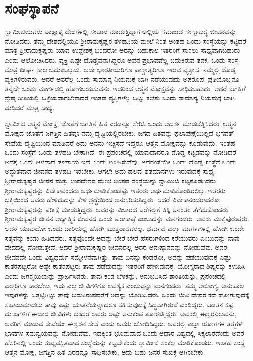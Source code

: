 
\chapter{ಸಂಘಸ್ಥಾಪನೆ}

 ಸ್ವಾಮೀಜಿಯವರು ಪಾಶ್ಚಾತ್ಯ ದೇಶಗಳಲ್ಲಿ ಸಂಚಾರ ಮಾಡುತ್ತಿದ್ದಾಗ ಅಲ್ಲಿಯ ಸಮಾಜದ ಸಂಸ್ಥಾಬದ್ಧ ಜೀವನವನ್ನು ನೋಡಿದರು. ತಮ್ಮ ದೇಶದಲ್ಲಿಯೂ ಶ‍್ರೀರಾಮಕೃಷ್ಣರ ತಳಹದಿಯ ಮೇಲೆ ನಿಂತ ಅಂತಹ ಒಂದು ಸಂಸ್ಥೆಯನ್ನು ಕಟ್ಟಿದರೆ ಮಾತ್ರ ಶ‍್ರೀರಾಮಕೃಷ್ಣರು ಯಾವ ಉದ್ದೇಶಕ್ಕೆ ಬಂದರೋ ಅದನ್ನು ಬಹುಕಾಲ ಇತರರಿಗೆ ಸಾರಲು ಸಾಧ್ಯವಾಗಬಹುದು ಎಂದು ಆಲೋಚಿಸಿದರು. ವ್ಯಕ್ತಿ ಎಷ್ಟೇ ದೊಡ್ಡವನಾಗಿದ್ದರೂ ಅವನ ಪ್ರಭಾವವೆಲ್ಲ ಬದುಕಿರುವ ತನಕ. ಒಂದು ಸಂಸ್ಥೆ ಮಾತ್ರ ದೀರ್ಘ ಕಾಲ ಬದುಕಬಲ್ಲದು. ಅದೇ ಭಾರತೀಯರಿಗೂ‌ ಪಾಶ್ಚಾತ್ಯರಿಗೂ ಇರುವ ವ್ಯತ್ಯಾಸ. ನಮ್ಮಲ್ಲಿ ದೊಡ್ಡ ವ್ಯಕ್ತಿಗಳಿರುವರು, ಆದರೆ ಅವರೆಲ್ಲ ಒಂದು ಸಾಮಾನ್ಯ ನಿಯಮಕ್ಕೆ ಬಾಗಿ ನಡೆಯುವುದು ಅಪರೂಪ. ಪ್ರತಿಯೊಬ್ಬನೂ ತನ್ನದೇ ಒಂದು ಮಾರ್ಗದಲ್ಲಿ ಹೋಗಬಯಸುವನು. ಇದರಿಂದ ಆತ್ಮನ ಮೋಕ್ಷವನ್ನು ಸಾಧಿಸಬಹುದು. ಆದರೆ ಜಗತ್ತಿಗೆ ಶ್ರೇಷ್ಠ ರೀತಿಯಲ್ಲಿ ಒಳ್ಳೆಯದಾಗಬೇಕಾದರೆ ಇಂತಹ ವ್ಯಕ್ತಿಗಳೆಲ್ಲ ಒಟ್ಟು ಕಲೆತು ಒಂದು ಸಾಮಾನ್ಯ ನಿಯಮಕ್ಕೆ ಬಾಗಿ ದುಡಿದರೆ ಮಾತ್ರ ಸಾಧ್ಯ. 

 ಸ್ವಾಮೀಜಿ ಆತ್ಮನ ಮೋಕ್ಷ, ಜೊತೆಗೆ ಜಗತ್ತಿನ ಹಿತ ಎರಡನ್ನೂ ಸೇರಿಸಿ ಒಂದು ಆದರ್ಶ ಮಾಡಲೆತ್ನಿಸಿದರು. ಆತ್ಮನ ಮೋಕ್ಷದ ಜೊತೆಗೆ ಜಗತ್ತಿನ ಹಿತವೂ ನಮ್ಮ ದೃಷ್ಟಿಯಲ್ಲಿರಬೇಕು. ಜಗದ ಹಿತವನ್ನು ಫಲಾಪೇಕ್ಷೆಯಿಲ್ಲದೆ ಭಗವತ್ ಸೇವೆಯ ದೃಷ್ಟಿಯಿಂದ ಮಾಡಿದರೆ ಅದು ಅವನು ಇಚ್ಛಿಸದೆ ಇದ್ದರೂ ಆತ್ಮನ ಮೋಕ್ಷವನ್ನು ಕೊಡುವುದು. ಇಂತಹ ಒಂದು ಸಂಸ್ಥೆಗೆ ಒಂದು ತಳಹದಿ ಬೇಕಾಗಿದೆ. ಈ ಪ್ರಪಂಚದಲ್ಲಿ ಯಾವುದಾದರೂ ದೊಡ್ಡ ಕಟ್ಟಡವನ್ನು ನೋಡಿದರೆ ಅದಕ್ಕೆ ಒಂದು ಆಳವಾದ ತಳಪಾಯ ಇದೆ ಎಂದು ಊಹಿಸುವೆವು. ಅದರಂತೆಯೇ ಒಂದು ದೊಡ್ಡ ಸಂಸ್ಥೆಗೆ ಒಂದು ಅದ್ಭುತವಾದ ಜೀವನದ ತಳಹದಿ ಇರಬೇಕು. ಆಗಲೇ ಅದು ಹಲವು ಶತಮಾನಗಳು ಇರುವುದಕ್ಕೆ ಸಾಧ್ಯ. ಶ‍್ರೀರಾಮಕೃಷ್ಣರ ಜೀವನ ಮತ್ತು ಉಪದೇಶದ ಮೇಲೆ ಅಂತಹ ಸಂಸ್ಥೆಯನ್ನು ಸ್ವಾಮೀಜಿ ಕಟ್ಟತೊಡಗಿದರು. ಶ‍್ರೀರಾಮಕೃಷ್ಣರನ್ನು ವಿವೇಕಾನಂದರು ಅರ್ಥಮಾಡಿಕೊಂಡಷ್ಟು ಇತರರು ಅರ್ಥಮಾಡಿಕೊಂಡಿರಲಿಲ್ಲ. ಇತರರು ಭಕ್ತಿಯಿಂದ ಅವರು ಹೇಳಿದುದನ್ನು ಕೇಳಿ ಶ್ರದ್ಧೆಯಿಂದ ಅನುಸರಿಸುತ್ತಿದ್ದರು. ಆದರೆ ವಿವೇಕಾನಂದರಾದರೋ ಶ‍್ರೀರಾಮಕೃಷ್ಣರನ್ನು ಪರೀಕ್ಷೆ ಮಾಡುತ್ತಿದ್ದರು. ಅವರನ್ನು ವಿಚಾರದ ಒರೆಗಲ್ಲಿಗೆ ತಿಕ್ಕಿ ಅನಂತರ ತೆಗೆದುಕೊಂಡರು. ಶ‍್ರೀರಾಮಕೃಷ್ಣರ ಜೀವನ ಆಧ್ಯಾತ್ಮಿಕ ಜೀವನದ ಒಂದು ಪರಾಕಾಷ್ಠೆ ಎಂಬುದನ್ನು ಮನಗಂಡರು. ಅವರು ಮುಕ್ತಪುರುಷರು. ಆದರೆ ಯಾವುದೋ ಒಂದು ದಾರಿಯಲ್ಲಿ ಹೋಗಿ ಮುಕ್ತರಾದವರಲ್ಲ. ಧರ್ಮದ ಎಲ್ಲಾ ಮಾರ್ಗಗಳಲ್ಲಿ ಹೋಗಿ ಒಂದೇ ಸತ್ಯವನ್ನು ಕಂಡು ಹಿಡಿದವರು. ಸತ್ಯವೊಂದೇ ಅದನ್ನು ಬೇರೆ ಬೇರೆ ಹೆಸರುಗಳಿಂದ ಕರೆಯುವರು ಎಂಬುದನ್ನು ನಾವು ವೇದದಲ್ಲಿ ನೋಡುತ್ತೇವೆ. ಆದರೆ ಶ‍್ರೀರಾಮಕೃಷ್ಣರ ಜೀವನದಲ್ಲಿ ಅದರ ಅನುಷ್ಠಾನವನ್ನು ನೋಡುವೆವು. ಅವರ ಜೀವನವೇ ಒಂದು ವಿಶ್ವಧರ್ಮ ಸಮ್ಮೇಳನವಾಗಿತ್ತು. ತಾವು ಏನನ್ನು ಕಂಡರೋ, ಅದನ್ನು ಪಡೆಯುವುದಕ್ಕೆ ಎಷ್ಟು ಕಾತರಪಟ್ಟರೋ ಅಷ್ಟೇ ಕಾತರಪಟ್ಟರು ತಾವು ಪಡೆದುದನ್ನು ಇತರರಿಗೆ ಹೇಳುವುದಕ್ಕೆ. ಯೋಗ್ಯರಾದ ಶಿಷ್ಯರನ್ನು ಕಳುಹಿಸಿ ಎಂದು ಜಗನ್ಮಯಿಯನ್ನು ಪ್ರಾರ್ಥಿಸಿದರು. ತಾವು ಕಂಡ ಬೆಳಕನ್ನು, ಅನುಭವಿಸಿದ ಶಾಂತಿಯನ್ನು, ಪ್ರಪಂಚದಲ್ಲಿ ಎಲ್ಲರಿಗೂ ಸಾರಬೇಕು, ಇದು ಎಲ್ಲ ಜೀವಿಗಳಿಗೂ ಆವಶ್ಯಕ ಎಂಬುದನ್ನು ಮನಗಂಡರು. ತಮ್ಮ ಆರೋಗ್ಯ, ಅನುಕೂಲ ಇವುಗಳನ್ನು ಒತ್ತಟ್ಟಿಗಿಟ್ಟು ತಾವು ಬದುಕಿರುವವರೆಗೆ ಅದನ್ನು ಬೋಧಿಸಿದರು. ಒಂದು ಜೀವಿ ದೇವರ ಕಡೆ ಹೋಗುವುದಕ್ಕೆ ಸಹಾಯಮಾಡಲು ತಾವು ಎಷ್ಟು ಯಾತನೆಯನ್ನಾದರೂ ಸಹಿಸುವುದಕ್ಕೆ ಸಿದ್ಧವಾಗಿರುವೆ ಎಂದಿದ್ದರು. ಬಡತನ ಕಷ್ಟ ದುಃಖಗಳಿಗೆ ಈಡಾದ ಜೀವಿಗಳು ಬಂದರೆ ಅವರು ಅಷ್ಟೇ ಅನುಕಂಪ ತೋರುತ್ತಿದ್ದರು. ಅವರಲ್ಲಿ ಈಶ್ವರನಿರುವನು, ಅವರಿಗೆ ಮಾಡುವ ಸೇವೆಯೇ ಈಶ್ವರನ ಸೇವೆ ಎಂದು ಅವರು ಬೋಧಿಸಿದ್ದರು. ಅವರಲ್ಲಿ ಎಲ್ಲಾ ಯೋಗಗಳ ತತ್ತ್ವಗಳ ಭಾವಗಳ ಸಮನ್ವಯವನ್ನು ನೋಡುವೆವು. ಇದಕ್ಕಿಂತ ಭೂಮವಾದ ಒಂದು ಆಧಾರ ವಿಶ್ವದಲ್ಲಿ ಸಿಕ್ಕಲಾರದೆಂದು ಅವರ ಹೆಸರಿನಲ್ಲಿ ಒಂದು ಸುವ್ಯವಸ್ಥಿತವಾದ ಸಂಸ್ಥೆಯನ್ನು ಕಟ್ಟಬೇಕೆಂದು ಸ್ವಾಮೀಜಿ ಸಂಕಲ್ಪ ಮಾಡಿಕೊಂಡರು. ಇಂತಹ ಸಂಸ್ಥೆ ಆತ್ಮನ ಮೋಕ್ಷ, ಜಗತ್ತಿನ ಹಿತ ಎರಡನ್ನೂ ಸಾಧಿಸಬೇಕು, ಅದು ಬಹು ಜನರ ಸುಖಕ್ಕೆ ಆಗಿರಬೇಕು. 

